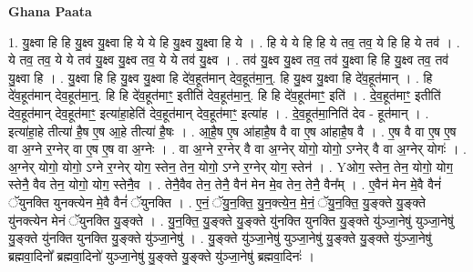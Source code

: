 \documentclass[17pt]{extarticle}
\begin{document}
\textbf{Ghana Paata } \newline

1. यु॒क्ष्वा हि हि यु॒क्ष्व यु॒क्ष्वा हि ये ये हि यु॒क्ष्व यु॒क्ष्वा हि ये । . हि ये ये हि हि ये तव॒ तव॒ ये हि हि ये तव॑ । . ये तव॒ तव॒ ये ये तव॑ यु॒क्ष्व यु॒क्ष्व तव॒ ये ये तव॑ यु॒क्ष्व । . तव॑ यु॒क्ष्व यु॒क्ष्व तव॒ तव॑ यु॒क्ष्वा हि हि यु॒क्ष्व तव॒ तव॑ यु॒क्ष्वा हि । . यु॒क्ष्वा हि हि यु॒क्ष्व यु॒क्ष्वा हि दे॑व॒हूत॑मान् देव॒हूत॑मा॒न्॒. हि यु॒क्ष्व यु॒क्ष्वा हि दे॑व॒हूत॑मान् । . हि दे॑व॒हूत॑मान् देव॒हूत॑मा॒न्॒. हि हि दे॑व॒हूत॑माꣳ॒॒ इतीति॑ देव॒हूत॑मा॒न्॒. हि हि दे॑व॒हूत॑माꣳ॒॒ इति॑ । . दे॒व॒हूत॑माꣳ॒॒ इतीति॑ देव॒हूत॑मान् देव॒हूत॑माꣳ॒॒ इत्या॑हा॒हेति॑ देव॒हूत॑मान् देव॒हूत॑माꣳ॒॒ इत्या॑ह । . दे॒व॒हूत॑मा॒निति॑ देव - हूत॑मान् । . इत्या॑हा॒हे तीत्या॑ है॒ष ए॒ष आ॒हे तीत्या॑ है॒षः । . आ॒है॒ष ए॒ष आ॑हाहै॒ष वै वा ए॒ष आ॑हाहै॒ष वै । . ए॒ष वै वा ए॒ष ए॒ष वा अ॒ग्ने र॒ग्नेर् वा ए॒ष ए॒ष वा अ॒ग्नेः । . वा अ॒ग्ने र॒ग्नेर् वै वा अ॒ग्नेर् योगो॒ योगो॒ ऽग्नेर् वै वा अ॒ग्नेर् योगः॑ । . अ॒ग्नेर् योगो॒ योगो॒ ऽग्ने र॒ग्नेर् योग॒ स्तेन॒ तेन॒ योगो॒ ऽग्ने र॒ग्नेर् योग॒ स्तेन॑ । . Yओग॒ स्तेन॒ तेन॒ योगो॒ योग॒ स्तेनै॒ वैव तेन॒ योगो॒ योग॒ स्तेनै॒व । . तेनै॒वैव तेन॒ तेनै॒ वैन॑ मेन मे॒व तेन॒ तेनै॒ वैन᳚म् । . ए॒वैन॑ मेन मे॒वै वैनं॑ ॅयुनक्ति युनक्त्येन मे॒वै वैनं॑ ॅयुनक्ति । . ए॒नं॒ ॅयु॒न॒क्ति॒ यु॒न॒क्त्ये॒न॒ मे॒नं॒ ॅयु॒न॒क्ति॒ यु॒ङ्क्ते यु॒ङ्क्ते यु॑नक्त्येन मेनं ॅयुनक्ति यु॒ङ्क्ते । . यु॒न॒क्ति॒ यु॒ङ्क्ते यु॒ङ्क्ते यु॑नक्ति युनक्ति यु॒ङ्क्ते यु॑ञ्जा॒नेषु॑ युञ्जा॒नेषु॑ यु॒ङ्क्ते यु॑नक्ति युनक्ति यु॒ङ्क्ते यु॑ञ्जा॒नेषु॑ । . यु॒ङ्क्ते यु॑ञ्जा॒नेषु॑ युञ्जा॒नेषु॑ यु॒ङ्क्ते यु॒ङ्क्ते यु॑ञ्जा॒नेषु॑ ब्रह्मवा॒दिनो᳚ ब्रह्मवा॒दिनो॑ युञ्जा॒नेषु॑ यु॒ङ्क्ते यु॒ङ्क्ते यु॑ञ्जा॒नेषु॑ ब्रह्मवा॒दिनः॑ । \newline
\end{document}
